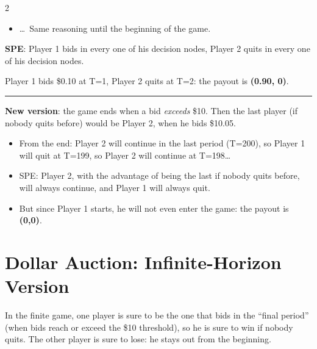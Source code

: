 \documentclass[a4paper,9pt]{extarticle}
\newcommand{\separator}{
\vspace{2pt}
\hrule
\vspace{3pt}
}
\begin{document}
\begin{multicols}{2}
\begin{itemize}
\item \dots\ Same reasoning until the beginning of the game.

\end{itemize}


\begin{important}

\textbf{SPE}: Player 1 bids in every one of his decision nodes, Player 2 quits in every one of
his decision nodes.

Player 1 bids \$0.10 at T=1, Player 2 quits at T=2: the payout is \textbf{(0.90, 0)}.

\end{important}


\separator


\textbf{New version}: the game ends when a bid \emph{exceeds} \$10. Then the last player (if
nobody quits before) would be Player 2, when he bids \$10.05.


\begin{important}

\begin{itemize}

\item From the end: Player 2 will continue in the last period (T=200), so Player 1 will quit
at T=199, so Player 2 will continue at T=198\dots

\item SPE: Player 2, with the advantage of being the last if nobody quits before, will always
continue, and Player 1 will always quit.

\item But since Player 1 starts, he will not even enter the game: the payout is
\textbf{(0,0)}.

\end{itemize}

\end{important}



\section{Dollar Auction: Infinite-Horizon Version}


In the finite game, one player is sure to be the one that bids in the ``final period'' (when
bids reach or exceed the \$10 threshold), so he is sure to win if nobody quits. The other
player is sure to lose: he stays out from the beginning.


\end{multicols}
\end{document}
